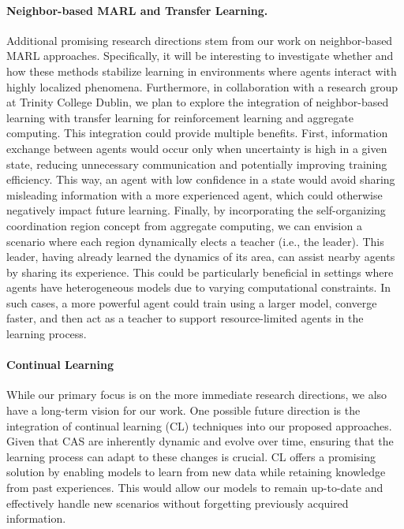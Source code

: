 \documentclass[runningheads]{llncs}
\begin{document}
\paragraph{Neighbor-based MARL and Transfer Learning.}
Additional promising research directions stem from our work on neighbor-based MARL approaches.
%
Specifically, it will be interesting to investigate whether and how these methods stabilize learning in environments 
 where agents interact with highly localized phenomena. 
% 
Furthermore, in collaboration with a research group at Trinity College Dublin, we plan to explore the integration of neighbor-based 
 learning with transfer learning for reinforcement learning and aggregate computing.
%
This integration could provide multiple benefits. 
%
First, information exchange between agents would occur only when uncertainty is high in a given state, reducing unnecessary communication 
 and potentially improving training efficiency. 
% 
This way, an agent with low confidence in a state would avoid sharing misleading information with a more experienced agent, 
 which could otherwise negatively impact future learning.
%
Finally, by incorporating the self-organizing coordination region concept from aggregate computing, we can envision a scenario where 
 each region dynamically elects a teacher (i.e., the leader).
% 
This leader, having already learned the dynamics of its area, can assist nearby agents by sharing its experience. 
%
This could be particularly beneficial in settings where agents have heterogeneous models due to varying computational constraints. 
%
In such cases, a more powerful agent could train using a larger model, converge faster, and then act as a teacher to support resource-limited 
 agents in the learning process.

\paragraph{Continual Learning}
While our primary focus is on the more immediate research directions, 
 we also have a long-term vision for our work. 
% 
One possible future direction is the integration of continual learning (CL) techniques into our proposed approaches. 
%
Given that CAS are inherently dynamic and evolve over time, ensuring that the learning process can adapt to these changes is crucial. 
%
CL offers a promising solution by enabling models to learn from new data while retaining knowledge from past experiences. 
%
This would allow our models to remain up-to-date and effectively handle new scenarios without forgetting previously 
 acquired information.
\end{document}

